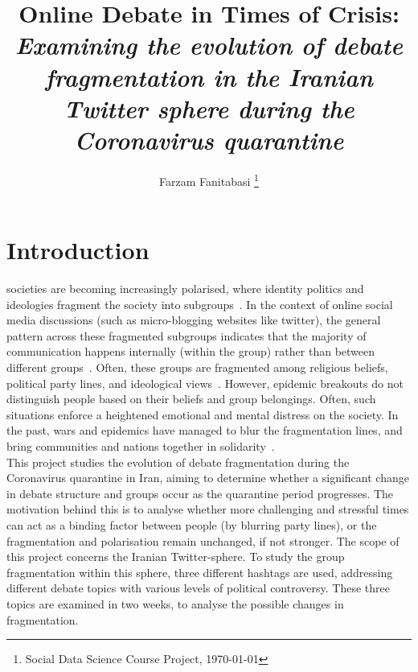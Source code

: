 \documentclass[journal,11pt]{IEEEtran}
\begin{document}
\title{Online Debate in Times of Crisis:\\ \normalsize{\textit{Examining the evolution of debate fragmentation in the Iranian Twitter sphere during the Coronavirus quarantine}}}
\author{Farzam Fanitabasi
\thanks{Social Data Science Course Project, \today}}
\maketitle
\IEEEpeerreviewmaketitle
\section{Introduction}
\label{S:Intro}
 societies are becoming increasingly polarised, where identity politics and ideologies fragment the society into subgroups~\cite{gillani2018me}. 
In the context of online social media discussions (such as micro-blogging websites like twitter), the general pattern across these fragmented subgroups indicates that the majority of communication happens internally (within the group) rather than between different groups~\cite{garcia2015ideological}. Often, these groups are fragmented among religious beliefs, political party lines, and ideological views~\cite{bright2018explaining}. However, epidemic breakouts do not distinguish people based on their beliefs and group belongings. Often, such situations enforce a heightened emotional and mental distress on the society. In the past, wars and epidemics have managed to blur the fragmentation lines, and bring communities and nations together in solidarity~\cite{}. \\

This project studies the evolution of debate fragmentation during the Coronavirus quarantine in Iran, aiming to determine whether a significant change in debate structure and groups occur as the quarantine period progresses. The motivation behind this is to analyse whether more challenging and stressful times can act as a binding factor between people (by blurring party lines), or the fragmentation and polarisation remain unchanged, if not stronger. The scope of this project concerns the Iranian Twitter-sphere. To study the group fragmentation within this sphere, three different hashtags are used, addressing different debate topics with various levels of political controversy. These three topics are examined in two weeks, to analyse the possible changes in fragmentation.
\end{document}
